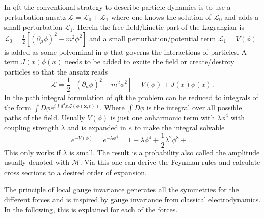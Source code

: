In \ac{qft} the conventional strategy to describe particle dynamics is to use a perturbation ansatz $\mathcal{L}=\mathcal{L}_0+\mathcal{L}_1$ where one knows the solution of $\mathcal{L}_0$ and adds a small perturbation $\mathcal{L}_1$. Herein the free field/kinetic part of the Lagrangian is \mbox{$\mathcal{L}_0=\frac{1}{2}[(\partial_\mu \phi)^2 - m^2\phi^2] $} and a small perturbation/potential term $\mathcal{L}_1=V(\phi)$ is added as some polyominal in $\phi$ that governs the interactions of particles. A term $J(x)\phi(x)$ needs to be added to excite the field or create/destroy particles so that the ansatz reads
\begin{equation}
    \mathcal{L}=\frac{1}{2}[(\partial_\mu \phi)^2 - m^2\phi^2]
    -V(\phi) + J(x)\phi(x).
\end{equation}
In the path integral formulation of \ac{qft} the problem can be reduced to integrals of the form \mbox{$\int D\phi e^{i\int d^4x \mathcal{L}(\phi(\bm{x},t))}$}. Where $\int D\phi$ is the integral over all possible paths of the field. Usually $V(\phi)$ is just one anharmonic term with $\lambda\phi^4$ with coupling strength $\lambda$ and is expanded in $e$ to make the integral solvable
\begin{equation}
    e^{-V(\phi)}=e^{-\lambda\phi^4}=1-\lambda\phi^4+\frac{1}{2}\lambda^2\phi^8+\dots
\end{equation}
This only works if $\lambda$ is small. The result is a probability also called the amplitude usually denoted with $\mathcal{M}$. Via this one can derive the Feynman rules and calculate cross sections to a desired order of expansion.

The principle of local gauge invariance generates all the symmetries for the different forces and is inspired by gauge invariance from classical electrodynamics. In the following, this is explained for each of the forces.

